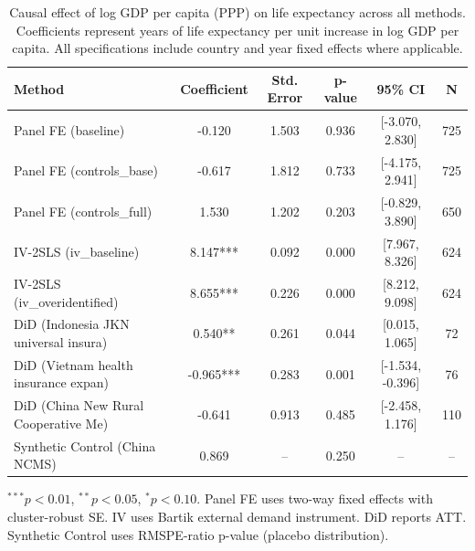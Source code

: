 \begin{table}[htbp]
\centering
\caption{Causal effect of log GDP per capita (PPP) on life expectancy across all methods. Coefficients represent years of life expectancy per unit increase in log GDP per capita. All specifications include country and year fixed effects where applicable.}
\label{tab:synthesis}
\begin{tabular}{lccccc}
\toprule
Method & Coefficient & Std. Error & p-value & 95\% CI & N \\
\midrule
Panel FE (baseline) & -0.120 & 1.503 & 0.936 & [-3.070, 2.830] & 725 \\
Panel FE (controls_base) & -0.617 & 1.812 & 0.733 & [-4.175, 2.941] & 725 \\
Panel FE (controls_full) & 1.530 & 1.202 & 0.203 & [-0.829, 3.890] & 650 \\
IV-2SLS (iv_baseline) & 8.147*** & 0.092 & 0.000 & [7.967, 8.326] & 624 \\
IV-2SLS (iv_overidentified) & 8.655*** & 0.226 & 0.000 & [8.212, 9.098] & 624 \\
DiD (Indonesia JKN universal insura) & 0.540** & 0.261 & 0.044 & [0.015, 1.065] & 72 \\
DiD (Vietnam health insurance expan) & -0.965*** & 0.283 & 0.001 & [-1.534, -0.396] & 76 \\
DiD (China New Rural Cooperative Me) & -0.641 & 0.913 & 0.485 & [-2.458, 1.176] & 110 \\
Synthetic Control (China NCMS) & 0.869 & -- & 0.250 & -- & -- \\
\bottomrule
\end{tabular}
\begin{tablenotes}\small\item $^{***}p<0.01$, $^{**}p<0.05$, $^{*}p<0.10$. Panel FE uses two-way fixed effects with cluster-robust SE. IV uses Bartik external demand instrument. DiD reports ATT. Synthetic Control uses RMSPE-ratio p-value (placebo distribution).\end{tablenotes}
\end{table}